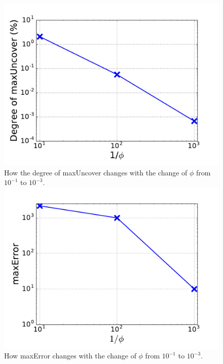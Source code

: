 




\begin{figure}[!htb]

%
  \includegraphics[width=\linewidth]{figure/maxUncover.pdf}
  {
  How the degree of maxUncover changes with the change of $\phi$ from $10^{-1}$ to $10^{-3}$.
  }
\endminipage\hfill
{}%
  \includegraphics[width=\linewidth]{figure/maxError.pdf}
  {How maxError changes with the change of $\phi$ from $10^{-1}$ to $10^{-3}$.}


\end{figure}
